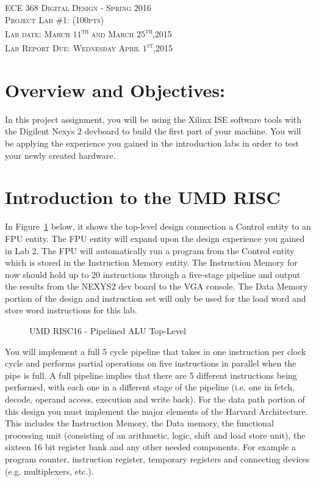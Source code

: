 \documentclass{article}
\begin{document}
\begin{center}
\textsc{\huge ECE 368 Digital Design - Spring 2016}\\[1cm]
\textsc{{\LARGE Project Lab \#1: (100pts)}}\\[0.5cm]
\textsc{\Large Lab date: March $11$\textsuperscript{th} and March $25$\textsuperscript{th},2015}\\[0.5cm]
\textsc{\Large Lab Report Due: Wednesday April $1$\textsuperscript{st},2015}\\[1cm]
\end{center}

\section{Overview and Objectives:}
In this project assignment, you will be using the Xilinx ISE software tools with the Digilent Nexys 2 devboard to build the first part of your machine. You will be applying the experience you gained in the introduction labs in order to test your newly created hardware.

\section{Introduction to the UMD RISC}
In Figure~\ref{fig:pipetoplevel} below, it shows the top-level design connection a Control entity to an FPU entity. The FPU entity will expand upon the design experience you gained in Lab 2. The FPU will automatically run a program from the Control entity which is stored in the Instruction Memory entity. The Instruction Memory for now should hold up to 20 instructions through a five-stage pipeline and output the results from the NEXYS2 dev board to the VGA console. The Data Memory portion of the design and instruction set will only be used for the load word and store word instructions for this lab.

\begin{figure}[!htbp]
  \centering
  \caption{UMD RISC16 - Pipelined ALU Top-Level}
  \label{fig:pipetoplevel}
\end{figure}
\FloatBarrier

You will implement a full 5 cycle pipeline that takes in one instruction per clock cycle and performs partial operations on five instructions in parallel when the pipe is full. A full pipeline implies that there are 5 different instructions being performed, with each one in a different stage of the pipeline (i.e. one in fetch, decode, operand access, execution and write back). For the data path portion of this design you must implement the major elements of the Harvard Architecture. This includes the Instruction Memory, the Data memory, the functional processing unit (consisting of an arithmetic, logic, shift and load store unit), the sixteen 16 bit register bank and any other needed components. For example a program counter, instruction register, temporary registers and connecting devices (e.g. multiplexers, etc.). 
\end{document}
